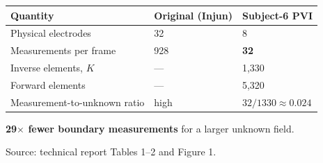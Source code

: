 \documentclass[border=6pt]{standalone}
\begin{document}
\begin{minipage}{15.6cm}

  \vspace{0.35em}
  \renewcommand{\arraystretch}{1.38}
  \setlength{\tabcolsep}{7pt}
  \begin{tabular}{@{}L{6.2cm}C{4.1cm}C{4.1cm}@{}}
    \toprule
    \textbf{Quantity} &
    \textbf{Original (Injun)} &
    \textbf{Subject-6 PVI} \\
    \midrule
    Physical electrodes & 32 & 8 \\
    Measurements per frame & 928 & \textbf{32} \\
    Inverse elements, $K$ & --- & 1,330 \\
    Forward elements & --- & 5,320 \\
    Measurement-to-unknown ratio & high &
      $32/1330\approx\mathbf{0.024}$ \\
    \bottomrule
  \end{tabular}

  \vspace{0.5em}
  {\small\color{realCoral}\textbf{29$\times$ fewer boundary
  measurements} for a larger unknown field.}


  {\scriptsize\color{baselineGray}Source: technical report Tables 1--2 and
  Figure 1.}
\end{minipage}
\end{document}
